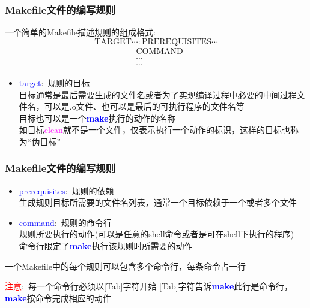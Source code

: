 \frame
{
	\frametitle{\textrm{Makefile}文件的编写规则}
	一个简单的\textrm{Makefile}描述规则的组成格式:
	\begin{displaymath}
		\mathrm{TARGET}\cdots : \mathrm{PREREQUISITES}\cdots
	\end{displaymath}
	\begin{displaymath}
		\begin{matrix}
			&\textrm{COMMAND}\\
			&\cdots\\
			&\cdots
		\end{matrix}
	\end{displaymath}

	\begin{itemize}
		\item \textcolor{blue}{\textrm{target}}:~规则的目标\\
			目标通常是最后需要生成的文件名或者为了实现编译过程中必要的中间过程文件名，可以是.o文件、也可以是最后的可执行程序的文件名等\\
			目标也可以是一个\textcolor{blue}{\textbf{make}}执行的动作的名称\\ 
			如目标\textcolor{magenta}{\textrm{clean}}就不是一个文件，仅表示执行一个动作的标识，这样的目标也称为“伪目标”
	\end{itemize}
}

\frame
{
	\frametitle{\textrm{Makefile}文件的编写规则}
	\begin{itemize}
		\item \textcolor{blue}{\textrm{prerequisites}}:~规则的依赖\\
			生成规则目标所需要的文件名列表，通常一个目标依赖于一个或者多个文件

		\item \textcolor{blue}{\textrm{command}}:~规则的命令行\\
			规则所要执行的动作(可以是任意的\textrm{shell}命令或者是可在\textrm{shell}下执行的程序)\\
			命令行限定了\textcolor{blue}{\textbf{make}}执行该规则时所需要的动作
	\end{itemize}

	一个\textrm{Makefile}中的每个规则可以包含多个命令行，每条命令占一行

	\vskip 8pt
	\textcolor{red}{注意}:~每一个命令行必须以[\textrm{Tab}]字符开始
\vskip 5pt
	\textrm{[Tab]}字符告诉\textcolor{blue}{\textbf{make}}此行是命令行，\textcolor{blue}{\textbf{make}}按命令完成相应的动作
}


